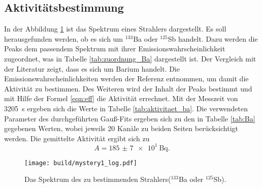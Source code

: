 \subsection{Aktivitätsbestimmung}
\label{sec:Aktiv}
In der Abbildung \ref{fig:mystery1} ist das Spektrum eines Strahlers dargestellt. Es soll herausgefunden werden,
ob es sich um ${}^{133}$Ba oder ${}^{125}$Sb handelt. Dazu werden
die Peaks dem passendem Spektrum mit ihrer Emissionswahrscheinlichkeit zugeordnet, was in Tabelle \ref{tab:zuordnung_Ba}
dargestellt ist. Der Vergleich mit der Literatur \cite{referenz1} zeigt, dass es sich um Barium handelt. 
Die Emissionswahrscheinlichkeiten werden der Referenz \cite{referenz1} entnommen, um damit die Aktivität zu bestimmen. 
Des Weiteren wird der Inhalt der Peaks bestimmt und mit Hilfe der Formel 
\ref{eqn:eff} die Aktivität errechnet. Mit der Messzeit von \SI{3205}{\second} ergeben sich die Werte in Tabelle 
\ref{tab:aktivitaet_ba}. Die verwendeten Parameter des durchgeführten Gauß-Fits ergeben sich zu den in Tabelle \ref{tab:Ba} 
gegebenen Werten, wobei jeweils \num{20} Kanäle zu beiden Seiten berücksichtigt werden.
Die gemittelte Aktivität ergibt sich zu
\begin{equation*}
  A = \SI{185(7)e1}{\becquerel}.
\end{equation*}
 


\begin{figure}[htb]
 \centering
 \texttt{[image: build/mystery1\_log.pdf]}
 \caption{Das Spektrum des zu bestimmenden Strahlers(${}^{133}$Ba oder ${}^{125}$Sb).}
 \label{fig:mystery1}
\end{figure}
\FloatBarrier


